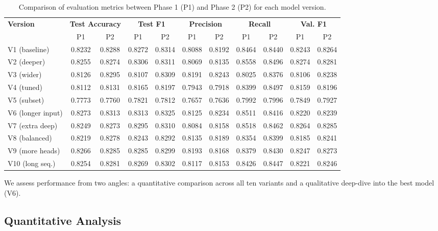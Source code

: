 \documentclass[twocolumn,superscriptaddress,aps]{revtex4-1}
\begin{document}
\begin{table*}[t]
\centering
\small
\begin{tabular}{|l|c|c|c|c|c|c|c|c|c|c|}
\hline
\textbf{Version} & \multicolumn{2}{c|}{\textbf{Test Accuracy}} & \multicolumn{2}{c|}{\textbf{Test F1}} & \multicolumn{2}{c|}{\textbf{Precision}} & \multicolumn{2}{c|}{\textbf{Recall}} & \multicolumn{2}{c|}{\textbf{Val. F1}} \\
 & P1 & P2 & P1 & P2 & P1 & P2 & P1 & P2 & P1 & P2 \\
\hline
V1 (baseline)     & 0.8232 & 0.8288 & 0.8272 & 0.8314 & 0.8088 & 0.8192 & 0.8464 & 0.8440 & 0.8243 & 0.8264 \\
V2 (deeper)       & 0.8255 & 0.8274 & 0.8306 & 0.8311 & 0.8069 & 0.8135 & 0.8558 & 0.8496 & 0.8274 & 0.8281 \\
V3 (wider)        & 0.8126 & 0.8295 & 0.8107 & 0.8309 & 0.8191 & 0.8243 & 0.8025 & 0.8376 & 0.8106 & 0.8238 \\
V4 (tuned)        & 0.8112 & 0.8131 & 0.8165 & 0.8197 & 0.7943 & 0.7918 & 0.8399 & 0.8497 & 0.8159 & 0.8196 \\
V5 (subset)       & 0.7773 & 0.7760 & 0.7821 & 0.7812 & 0.7657 & 0.7636 & 0.7992 & 0.7996 & 0.7849 & 0.7927 \\
V6 (longer input) & 0.8273 & 0.8313 & 0.8313 & 0.8325 & 0.8125 & 0.8234 & 0.8511 & 0.8416 & 0.8220 & 0.8239 \\
V7 (extra deep)   & 0.8249 & 0.8273 & 0.8295 & 0.8310 & 0.8084 & 0.8158 & 0.8518 & 0.8462 & 0.8264 & 0.8285 \\
V8 (balanced)     & 0.8219 & 0.8278 & 0.8243 & 0.8292 & 0.8135 & 0.8189 & 0.8354 & 0.8399 & 0.8185 & 0.8241 \\
V9 (more heads)   & 0.8266 & 0.8285 & 0.8285 & 0.8299 & 0.8193 & 0.8168 & 0.8379 & 0.8430 & 0.8247 & 0.8273 \\
V10 (long seq.)   & 0.8254 & 0.8281 & 0.8269 & 0.8302 & 0.8117 & 0.8153 & 0.8426 & 0.8447 & 0.8221 & 0.8246 \\
\hline
\end{tabular}
\caption{Comparison of evaluation metrics between Phase 1 (P1) and Phase 2 (P2) for each model version.}
\label{tab:final_results}
\end{table*}


We assess performance from two angles: a quantitative comparison across all ten variants and a qualitative deep-dive into the best model (V6).

\subsection{Quantitative Analysis}
\end{document}
